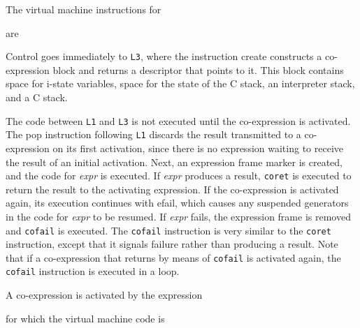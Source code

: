 The virtual machine instructions for


are

\goodbreak
{}

Control goes immediately to \texttt{L3}, where the instruction create
constructs a co-expression block and returns a descriptor that points
to it. This block contains space for i-state variables, space for the
state of the C stack, an interpreter stack, and a C stack.

The code between \texttt{L1} and \texttt{L3} is not executed until the
co-expression is activated. The pop instruction following \texttt{L1}
discards the result transmitted to a co-expression on its first
activation, since there is no expression waiting to receive the result
of an initial activation. Next, an expression frame marker is created,
and the code for \textit{expr} is executed. If
\textit{expr} produces a result, \texttt{coret} is
executed to return the result to the activating expression. If the
co-expression is activated again, its execution continues with efail,
which causes any suspended generators in the code for
\textit{expr} to be resumed. If
\textit{expr} fails, the expression frame is removed
and \texttt{cofail} is executed. The \texttt{cofail} instruction is
very similar to the \texttt{coret} instruction, except that it signals
failure rather than producing a result. Note that if a co-expression
that returns by means of \texttt{cofail} is activated again, the
\texttt{cofail} instruction is executed in a loop.

A co-expression is activated by the expression


\noindent for which the virtual machine code is


